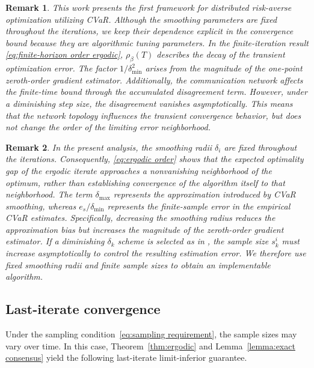 \documentclass[twocolumn]{autart}    %
\newtheorem{remark}{Remark}
\newcommand{\1}{\mathbf{1}}
\begin{document}
\begin{remark}
This work presents the first framework for distributed risk-averse optimization utilizing CVaR.  
Although the smoothing parameters are fixed throughout the iterations, we keep their dependence explicit in the convergence bound because they are algorithmic tuning parameters. 
In the finite-iteration result \eqref{eq:finite-horizon order ergodic}, $\rho_\beta(T)$ describes the decay of the transient optimization error.
The factor $1/\delta_{\min}^2$ arises from the magnitude of the one-point zeroth-order gradient estimator.  
Additionally, the communication network affects the finite-time bound through the accumulated disagreement term. 
However, under a diminishing step size, the disagreement vanishes asymptotically. 
This means that the network topology influences the transient convergence behavior, 
but does not change the order of the limiting error neighborhood.
\end{remark}

 


\begin{remark}
In the present analysis, the smoothing radii $\delta_i$ are fixed throughout the iterations. Consequently, \eqref{eq:ergodic order} shows that the expected optimality gap of the ergodic iterate approaches a nonvanishing neighborhood of the optimum, rather than establishing convergence of the algorithm itself to that neighborhood.
The term $\delta_{\max}$ represents the approximation introduced by CVaR smoothing, whereas $e_s/\delta_{\min}$ represents the finite-sample error in the empirical CVaR estimates.
Specifically, decreasing the smoothing radius reduces the approximation bias but increases the magnitude of the zeroth-order gradient estimator.
If a diminishing $\delta_k$ scheme is selected as in \cite{yi2022zeroth}, the sample size $s_k^i$ must increase asymptotically to control the resulting estimation error. We therefore use fixed smoothing radii and finite sample sizes to obtain an implementable algorithm.
\end{remark}
 
 
 

\subsection{Last-iterate convergence}\label{sec:last iterate}
%
%
%
%
%
%
%

Under the sampling condition~\eqref{eq:sampling requirement}, the sample sizes may vary over time. In this case, Theorem~\ref{thm:ergodic} and Lemma~\ref{lemma:exact consensus} yield the following last-iterate limit-inferior guarantee.
 
\end{document}
